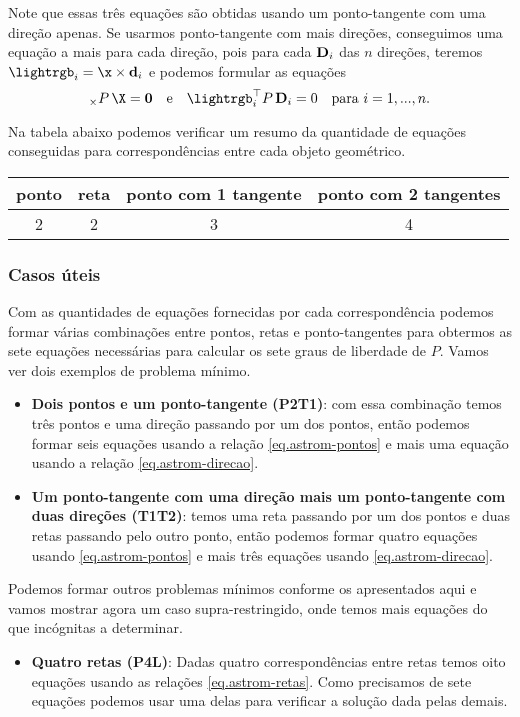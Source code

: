 Note que essas três equações são obtidas usando um ponto-tangente com uma direção apenas. Se usarmos ponto-tangente com mais direções, conseguimos uma equação a mais para cada direção, pois para cada ${\bf D}_i$ das $n$ direções, teremos $\lightrgb_i=\x\times{\bf d}_i$ e podemos formular as equações
\begin{equation}
[\x]_\times P\,\X={\bf 0}\quad\text{e}\quad\lightrgb_i^\top P\,{\bf D}_i=0\quad\text{para}\,\,i=1,...,n.
\end{equation}

Na tabela abaixo podemos verificar um resumo da quantidade de equações conseguidas para correspondências entre cada objeto geométrico.
\begin{center}
\begin{tabular}{|c|c|c|c|}
\hline 
ponto & reta & ponto com 1 tangente & ponto com 2 tangentes \\ 
\hline 
2 & 2 & 3 & 4 \\ 
\hline 
\end{tabular} 
\end{center}

\subsubsection{Casos úteis}

Com as quantidades de equações fornecidas por cada correspondência podemos formar várias combinações entre pontos, retas e ponto-tangentes para obtermos as sete equações necessárias para calcular os sete graus de liberdade de $P$. Vamos ver dois exemplos de problema mínimo.
\begin{itemize}
\item {\bf Dois pontos e um ponto-tangente (P2T1)}: com essa combinação temos três pontos e uma direção passando por um dos pontos, então podemos formar seis equações usando a relação \ref{eq.astrom-pontos} e mais uma equação usando a relação \ref{eq.astrom-direcao}. 

\item {\bf Um ponto-tangente com uma direção mais um ponto-tangente com duas direções (T1T2)}: temos uma reta passando por um dos pontos e duas retas passando pelo outro ponto, então podemos formar quatro equações usando \ref{eq.astrom-pontos} e mais três equações usando \ref{eq.astrom-direcao}.
\end{itemize} 

Podemos formar outros problemas mínimos conforme os apresentados aqui e vamos mostrar agora um caso supra-restringido, onde temos mais equações do que incógnitas a determinar.
\begin{itemize}
\item {\bf Quatro retas (P4L)}: Dadas quatro correspondências entre retas temos oito equações usando as relações \ref{eq.astrom-retas}. Como precisamos de sete equações podemos usar uma delas para verificar a solução dada pelas demais.
\end{itemize}

